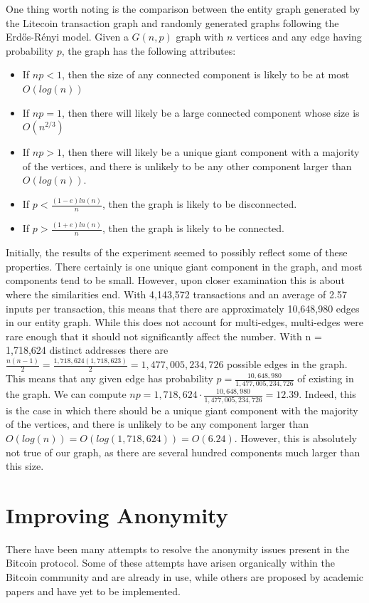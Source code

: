 \documentclass[11pt]{article}
\begin{document}
One thing worth noting is the comparison between the entity graph generated by the Litecoin transaction graph and
randomly generated graphs following the Erd\H{o}s-R\'{e}nyi model.\cite{erdos1959random} Given a $G(n, p)$ graph with
$n$ vertices and any edge having probability $p$, the graph has the following attributes:
\begin{itemize}
    \item If $np < 1$, then the size of any connected component is likely to be at most $O(log(n))$
    \item If $np = 1$, then there will likely be a large connected component whose size is $O(n^{2/3})$
    \item If $np > 1$, then there will likely be a unique giant component with a majority of the vertices, and there is
        unlikely to be any other component larger than $O(log(n))$.
    \item If $p < \frac{(1 - e) ln(n)}{n}$, then the graph is likely to be disconnected.
    \item If $p > \frac{(1 + e) ln(n)}{n}$, then the graph is likely to be connected.
\end{itemize}

Initially, the results of the experiment seemed to possibly reflect some of these properties. There certainly is one
unique giant component in the graph, and most components tend to be small. However, upon closer examination this is
about where the similarities end. With 4,143,572 transactions and an average of 2.57 inputs per transaction, this means
that there are approximately 10,648,980 edges in our entity graph. While this does not account for multi-edges,
multi-edges were rare enough that it should not significantly affect the number. With n = 1,718,624 distinct addresses
there are $\frac{n(n-1)}{2} = \frac{1,718,624(1,718,623)}{2} = 1,477,005,234,726$ possible edges in the graph. This
means that any given edge has probability $p = \frac{10,648,980}{1,477,005,234,726}$ of existing in the graph. We can
compute $np = 1,718,624 \cdot \frac{10,648,980}{1,477,005,234,726} = 12.39$. Indeed, this is the case in which there
should be a unique giant component with the majority of the vertices, and there is unlikely to be any component larger
than $O(log(n)) = O(log(1,718,624)) = O(6.24)$. However, this is absolutely not true of our graph, as there are several
hundred components much larger than this size.

\section{Improving Anonymity}
There have been many attempts to resolve the anonymity issues present in the Bitcoin protocol. Some of these attempts
have arisen organically within the Bitcoin community and are already in use, while others are proposed by academic
papers and have yet to be implemented.
\end{document}

